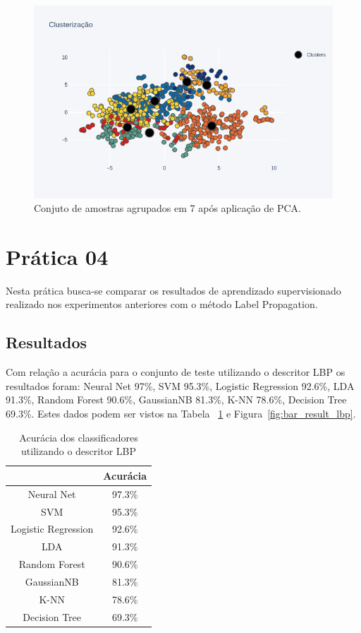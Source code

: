 \documentclass[a4paper, 12 pt, conference]{ieeeconf}  %
\begin{document}
\begin{figure}[!htbp]
	\centering
	\includegraphics[width=1.0\linewidth,clip=true,trim=0cm 0cm 0cm 0cm, keepaspectratio=true]{scatter_k7_lbp.png}
	\caption{Conjuto de amostras agrupados em 7 após aplicação de PCA.}
	\label{fig:scatter_k7_lbp}
\end{figure}

\section{Prática 04}
\label{pratica04}
Nesta prática busca-se comparar os resultados de aprendizado supervisionado realizado nos experimentos anteriores com o método Label Propagation.


\subsection{Resultados}
Com relação a acurácia para o conjunto de teste utilizando o descritor LBP os resultados foram: Neural Net 97\%, SVM  95.3\%, Logistic Regression 92.6\%, LDA 91.3\%, Random Forest 90.6\%, GaussianNB  81.3\%, K-NN 78.6\%, Decision Tree 69.3\%. Estes dados podem ser vistos na Tabela ~\ref{tab:result_lbp} e Figura~\ref{fig:bar_result_lbp}.


\begin{table}[!htbp]
	\caption{Acurácia dos classificadores utilizando o descritor LBP}
	\begin{center}
		\begin{tabular}{|c|c|}
			\hline
			& Acurácia \\
			\hline
			Neural Net          & 97.3\% \\
			SVM                 & 95.3\% \\
			Logistic Regression & 92.6\% \\
			LDA                 & 91.3\% \\
			Random Forest       & 90.6\% \\
			GaussianNB          & 81.3\% \\
			K-NN                & 78.6\% \\
			Decision Tree       & 69.3\% \\
			\hline
		\end{tabular}
		\label{tab:result_lbp}
	\end{center}
\end{table}
\end{document}
